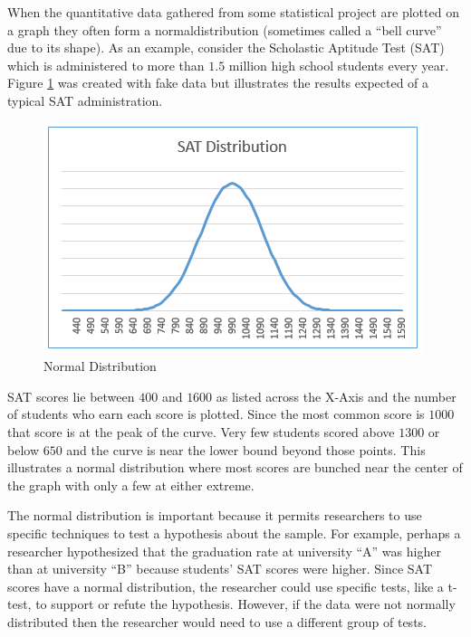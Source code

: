 When the quantitative data gathered from some statistical project are plotted on a graph they often form a \gls{normaldistribution} (sometimes called a ``bell curve'' due to its shape). As an example, consider the Scholastic Aptitude Test (SAT) which is administered to more than $ 1.5 $ million high school students every year. Figure \ref{fig06.01} was created with fake data but illustrates the results expected of a typical SAT administration.

\begin{figure}[H]
	\centering
	\includegraphics[width=\maxwidth{.95\linewidth}]{gfx/06-SATDistro}
	\caption{Normal Distribution}
	\label{fig06.01}
\end{figure}

SAT scores lie between $ 400 $ and $ 1600 $ as listed across the X-Axis and the number of students who earn each score is plotted. Since the most common score is $ 1000 $ that score is at the peak of the curve. Very few students scored above $ 1300 $ or below $ 650 $ and the curve is near the lower bound beyond those points. This illustrates a normal distribution where most scores are bunched near the center of the graph with only a few at either extreme.

The normal distribution is important because it permits researchers to use specific techniques to test a hypothesis about the sample. For example, perhaps a researcher hypothesized that the graduation rate at university ``A'' was higher than at university ``B'' because students' SAT scores were higher. Since SAT scores have a normal distribution, the researcher could use specific tests, like a t-test, to support or refute the hypothesis. However, if the data were not normally distributed then the researcher would need to use a different group of tests.

